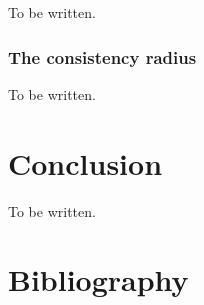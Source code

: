 \documentclass[]             %
{NASA}                       %
\theoremstyle{definition}
\begin{document}
To be written.

\hypertarget{the-consistency-radius}{%
\subsubsection{The consistency radius}\label{the-consistency-radius}}

To be written.

\hypertarget{conclusion}{%
\section{Conclusion}\label{conclusion}}

\label{sec:conclusion}

To be written.

\section*{Bibliography}\label{bibliography}



\end{document}
